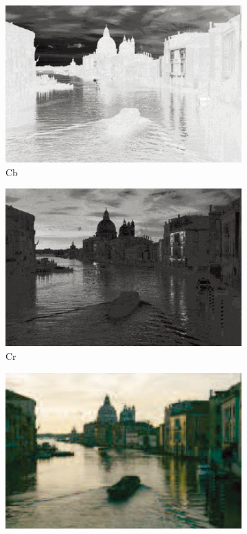 \documentclass[letterpaper,10pt]{article}
\begin{document}
\begin{figure}[htbp]
\begin{subfigure}{0.11\textwidth}
					\includegraphics[width=\linewidth]{picture/LLIE/Division Gets Better/Cb3}
					\captionsetup{font=scriptsize}
					\caption*{Cb}
					\label{fig: Cb3}
				\end{subfigure}
				\begin{subfigure}{0.11\textwidth}
					\includegraphics[width=\linewidth]{picture/LLIE/Division Gets Better/Cr3}
					\captionsetup{font=scriptsize}
					\caption*{Cr}
					\label{fig: Cr3}
				\end{subfigure}
				\begin{subfigure}{0.11\textwidth}
					\includegraphics[width=\linewidth]{picture/LLIE/Division Gets Better/Ours3}

\end{subfigure}
\end{figure}
\end{document}
